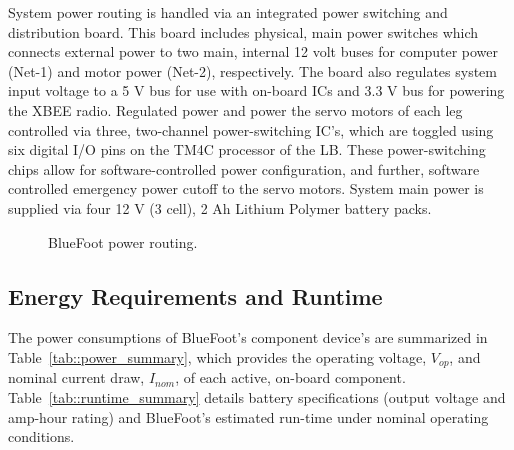 			System power routing is handled via an integrated power switching and distribution board. This board includes physical, main power switches which connects external power to two main, internal 12 volt buses for  computer power (Net-1) and motor power (Net-2), respectively. The board also regulates system input voltage to a 5 V bus for use with on-board ICs and 3.3 V bus for powering the XBEE radio. Regulated power and power the servo motors of each leg controlled via three, two-channel power-switching IC's, which are toggled using six digital I/O pins on the TM4C processor of the LB. These power-switching chips allow for software-controlled power configuration, and further, software controlled emergency power cutoff to the servo motors. System main power is supplied via four 12 V (3 cell), 2 Ah Lithium Polymer battery packs.
				\begin{figure}[h!]
					\centering
					\caption{BlueFoot power routing.}
					\label{fig::dev_diagram}
				\end{figure}
		
			\subsection{Energy Requirements and Runtime}

			
			The power consumptions of BlueFoot's component device's are summarized in Table~\ref{tab::power_summary}, which provides the operating voltage, $V_{op}$, and nominal current draw, $I_{nom}$, of each active, on-board component. Table~\ref{tab::runtime_summary} details battery specifications (output voltage and amp-hour rating) and BlueFoot's estimated run-time under nominal operating conditions.
		
